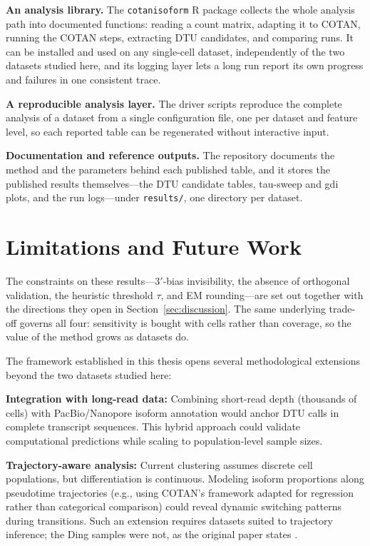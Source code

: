 \textbf{An analysis library.} The \texttt{cotanisoform} R package collects the whole analysis path into documented functions: reading a count matrix, adapting it to COTAN, running the COTAN steps, extracting DTU candidates, and comparing runs. It can be installed and used on any single-cell dataset, independently of the two datasets studied here, and its logging layer lets a long run report its own progress and failures in one consistent trace.

\textbf{A reproducible analysis layer.} The driver scripts reproduce the complete analysis of a dataset from a single configuration file, one per dataset and feature level, so each reported table can be regenerated without interactive input.

\textbf{Documentation and reference outputs.} The repository documents the method and the parameters behind each published table, and it stores the published results themselves---the DTU candidate tables, tau-sweep and \gls{gdi} plots, and the run logs---under \texttt{results/}, one directory per dataset.

\section{Limitations and Future Work}

The constraints on these results---$3'$-bias invisibility, the absence of orthogonal validation, the heuristic threshold $\tau$, and EM rounding---are set out together with the directions they open in Section~\ref{sec:discussion}. The same underlying trade-off governs all four: sensitivity is bought with cells rather than coverage, so the value of the method grows as datasets do.

The framework established in this thesis opens several methodological extensions beyond the two datasets studied here:

\textbf{Integration with long-read data:} Combining short-read depth (thousands of cells) with PacBio/Nanopore isoform annotation would anchor DTU calls in complete transcript sequences. This hybrid approach could validate computational predictions while scaling to population-level sample sizes.

\textbf{Trajectory-aware analysis:} Current clustering assumes discrete cell populations, but differentiation is continuous. Modeling isoform proportions along pseudotime trajectories (e.g., using COTAN's framework adapted for regression rather than categorical comparison) could reveal dynamic switching patterns during transitions. Such an extension requires datasets suited to trajectory inference; the Ding samples were not, as the original paper states \cite{ding2020systematic}.

